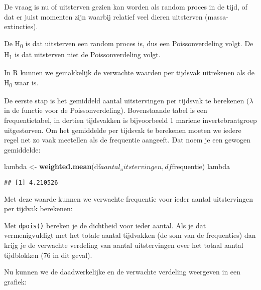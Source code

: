\documentclass[]{book}
\newenvironment{Shaded}{\begin{snugshade}}{\end{snugshade}}
\newcommand{\KeywordTok}[1]{\textcolor[rgb]{0.13,0.29,0.53}{\textbf{{#1}}}}
\newcommand{\DataTypeTok}[1]{\textcolor[rgb]{0.13,0.29,0.53}{{#1}}}
\newcommand{\StringTok}[1]{\textcolor[rgb]{0.31,0.60,0.02}{{#1}}}
\newcommand{\NormalTok}[1]{{#1}}
\theoremstyle{definition}
\theoremstyle{definition}
\theoremstyle{definition}
\theoremstyle{remark}
\begin{document}
De vraag is nu of uitsterven gezien kan worden als random proces in de
tijd, of dat er juist momenten zijn waarbij relatief veel dieren
uitsterven (massa-extincties).

De H\textsubscript{0} is dat uitsterven een random proces is, dus een
Poissonverdeling volgt. De H\textsubscript{1} is dat uitsterven niet de
Poissonverdeling volgt.

In R kunnen we gemakkelijk de verwachte waarden per tijdsvak uitrekenen
als de H\textsubscript{0} waar is.

De eerste stap is het gemiddeld aantal uitstervingen per tijdsvak te
berekenen (\(\lambda\) in de functie voor de Poissonverdeling).
Bovenstaande tabel is een frequentietabel, in dertien tijdsvakken is
bijvoorbeeld 1 mariene invertebraatgroep uitgestorven. Om het gemiddelde
per tijdsvak te berekenen moeten we iedere regel net zo vaak meetellen
als de frequentie aangeeft. Dat noem je een gewogen gemiddelde:

\begin{Shaded}
\begin{Highlighting}[]
\NormalTok{lambda <-}\StringTok{ }\KeywordTok{weighted.mean}\NormalTok{(df$aantal_uitstervingen, df$frequentie)}
\NormalTok{lambda}
\end{Highlighting}
\end{Shaded}

\begin{verbatim}
## [1] 4.210526
\end{verbatim}

Met deze waarde kunnen we verwachte frequentie voor ieder aantal
uitstervingen per tijdvak berekenen:

\begin{Shaded}
\end{Shaded}

Met \texttt{dpois()} bereken je de dichtheid voor ieder aantal. Als je
dat vermenigvuldigt met het totale aantal tijdvakken (de som van de
frequenties) dan krijg je de verwachte verdeling van aantal
uitstervingen over het totaal aantal tijdblokken (76 in dit geval).

Nu kunnen we de daadwerkelijke en de verwachte verdeling weergeven in
een grafiek:
\end{document}
